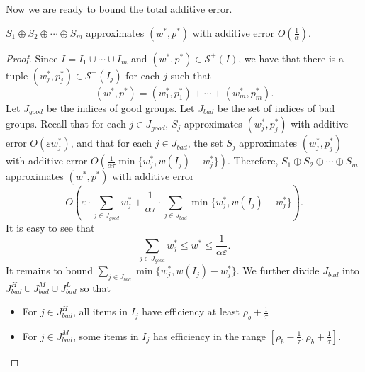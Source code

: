 \documentclass[a4paper,UKenglish,cleveref, autoref, thm-restate, pdfa]{lipics-v2021}
\newcommand{\eps}{\varepsilon}
\renewcommand{\leq}{\leqslant}
\begin{document}
Now we are ready to bound the total additive error.
\begin{lemma}\label{lem:total-err}
    $S_1 \oplus S_2 \oplus \cdots \oplus S_m$ approximates $(w^*, p^*)$ with additive error $O(\frac{1}{\alpha})$.
\end{lemma}
\begin{proof}
    Since $I = I_1 \cup \cdots \cup I_m$ and $(w^*, p^*) \in \mathcal{S}^+(I)$, we have that there is a tuple $(w^*_j, p^*_j) \in \mathcal{S}^+(I_j)$ for each $j$ such that 
    \[
        (w^*, p^*) = (w^*_1, p^*_1) + \cdots + (w^*_m, p^*_m).
    \]
    Let $J_{\mathit{good}}$ be the indices of good groups. Let $J_{\mathit bad}$ be the set of indices of bad groups. Recall that for each $j \in J_{\mathit good}$, $S_j$ approximates $(w^*_j, p^*_j)$ with additive error $O(\eps w^*_j)$, and that for each $j \in J_{\mathit bad}$, the set $S_j$ approximates $(w^*_j, p^*_j)$ with additive error $O(\frac{1}{\alpha\tau} \min\{w^*_j, w(I_j) - w^*_j\})$.  Therefore, $S_1 \oplus S_2 \oplus \cdots \oplus S_m$ approximates $(w^*, p^*)$ with additive error
    \[
        O(\eps\cdot \sum_{j \in J_{\mathit{good}}} w^*_j + \frac{1}{\alpha\tau}\cdot\sum_{j \in J_{\mathit{bad}}} \min\{w^*_j, w(I_j) - w^*_j\}).
    \]
    It is easy to see that
    \begin{equation}\label{eq:bound-good-groups}
         \sum_{j \in J_{\mathit{good}}} w^*_j \leq w^* \leq \frac{1}{\alpha\eps}.
    \end{equation}
    It remains to bound $\sum_{j \in J_{\mathit{bad}}} \min\{w^*_j, w(I_j) - w^*_j\}$. We further divide $J_{\mathit{bad}}$ into $J^H_{\mathit{bad}} \cup J^M_{\mathit{bad}} \cup J^L_{\mathit{bad}}$ so that 
    \begin{itemize}
        \item For $j \in J^H_{\mathit{bad}}$, all items in $I_j$ have efficiency at least $\rho_b + \frac{1}{\tau}$

        \item For $j \in J^M_{\mathit{bad}}$, some items in $I_j$ has efficiency in the range $[\rho_b - \frac{1}{\tau}, \rho_b + \frac{1}{\tau}]$.


\end{itemize}
\end{proof}
\end{document}
